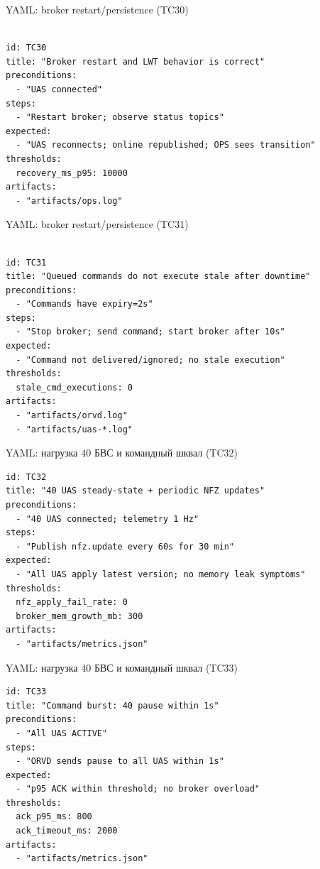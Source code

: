 \documentclass[aspectratio=169]{beamer}
\begin{document}
\begin{frame}[fragile]{YAML: broker restart/persistence (TC30)}
\begin{Verbatim}[fontsize=\scriptsize, baselinestretch=0.85]

id: TC30
title: "Broker restart and LWT behavior is correct"
preconditions:
  - "UAS connected"
steps:
  - "Restart broker; observe status topics"
expected:
  - "UAS reconnects; online republished; OPS sees transition"
thresholds:
  recovery_ms_p95: 10000
artifacts:
  - "artifacts/ops.log"
\end{Verbatim}
\end{frame}

\begin{frame}[fragile]{YAML: broker restart/persistence (TC31)}
\begin{Verbatim}[fontsize=\scriptsize, baselinestretch=0.85]

id: TC31
title: "Queued commands do not execute stale after downtime"
preconditions:
  - "Commands have expiry=2s"
steps:
  - "Stop broker; send command; start broker after 10s"
expected:
  - "Command not delivered/ignored; no stale execution"
thresholds:
  stale_cmd_executions: 0
artifacts:
  - "artifacts/orvd.log"
  - "artifacts/uas-*.log"
\end{Verbatim}
\end{frame}


\begin{frame}[fragile]{YAML: нагрузка 40 БВС и командный шквал (TC32)}
\begin{Verbatim}[fontsize=\scriptsize, baselinestretch=0.85]
id: TC32
title: "40 UAS steady-state + periodic NFZ updates"
preconditions:
  - "40 UAS connected; telemetry 1 Hz"
steps:
  - "Publish nfz.update every 60s for 30 min"
expected:
  - "All UAS apply latest version; no memory leak symptoms"
thresholds:
  nfz_apply_fail_rate: 0
  broker_mem_growth_mb: 300
artifacts:
  - "artifacts/metrics.json"
\end{Verbatim}
\end{frame}


\begin{frame}[fragile]{YAML: нагрузка 40 БВС и командный шквал (TC33)}
\begin{Verbatim}[fontsize=\scriptsize, baselinestretch=0.85]
id: TC33
title: "Command burst: 40 pause within 1s"
preconditions:
  - "All UAS ACTIVE"
steps:
  - "ORVD sends pause to all UAS within 1s"
expected:
  - "p95 ACK within threshold; no broker overload"
thresholds:
  ack_p95_ms: 800
  ack_timeout_ms: 2000
artifacts:
  - "artifacts/metrics.json"
\end{Verbatim}
\end{frame}
\end{document}
